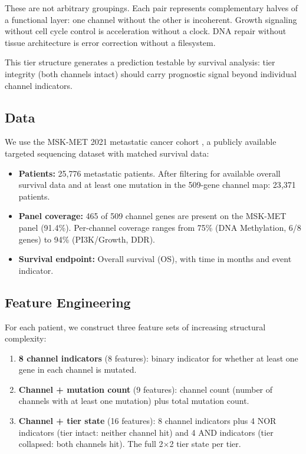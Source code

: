\documentclass[11pt]{article}
\begin{document}
These are not arbitrary groupings. Each pair represents
complementary halves of a functional layer: one channel without
the other is incoherent. Growth signaling without cell cycle
control is acceleration without a clock. DNA repair without
tissue architecture is error correction without a filesystem.

This tier structure generates a prediction testable by survival
analysis: tier integrity (both channels intact) should carry
prognostic signal beyond individual channel indicators.

\subsection{Data}

We use the MSK-MET 2021 metastatic cancer cohort
\cite{Nguyen2022}, a publicly available targeted sequencing
dataset with matched survival data:

\begin{itemize}
\item \textbf{Patients:} 25{,}776 metastatic patients. After
   filtering for available overall survival data and at least one
   mutation in the 509-gene channel map: 23{,}371 patients.
\item \textbf{Panel coverage:} 465 of 509 channel genes are
   present on the MSK-MET panel (91.4\%). Per-channel coverage
   ranges from 75\% (DNA Methylation, 6/8 genes) to 94\%
   (PI3K/Growth, DDR).
\item \textbf{Survival endpoint:} Overall survival (OS), with
   time in months and event indicator.
\end{itemize}

\subsection{Feature Engineering}

For each patient, we construct three feature sets of increasing
structural complexity:

\begin{enumerate}
\item \textbf{8 channel indicators} (8 features): binary
   indicator for whether at least one gene in each channel is
   mutated.
\item \textbf{Channel + mutation count} (9 features): channel
   count (number of channels with at least one mutation) plus
   total mutation count.
\item \textbf{Channel + tier state} (16 features): 8 channel
   indicators plus 4 NOR indicators (tier intact: neither channel
   hit) and 4 AND indicators (tier collapsed: both channels hit).
   The full 2$\times$2 tier state per tier.
\end{enumerate}
\end{document}

